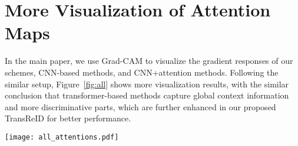 \documentclass[10pt,twocolumn,letterpaper]{article}
\begin{document}
\section{More Visualization of Attention Maps}
In the main paper, we use Grad-CAM to visualize the gradient responses of our schemes, CNN-based methods, and CNN+attention methods. Following the similar setup, Figure~\ref{fig:all} shows more visualization results, with the similar conclusion that transformer-based methods capture global context information and more discriminative parts, which are further enhanced in our proposed TransReID for better performance.

\begin{figure*}[t]
    \centering
    \texttt{[image: all\_attentions.pdf]}
	\vspace{-1.5em}
	\caption{Grad-CAM~\cite{grad_cam} visualization of attention maps. (a) Original images, (b) CNN-based methods, (c) CNN+Attention methods, (d) Transformer-based baseline, (e) TransReID w/o rearrange, (f) TransReID. Faces in the images are masked for anonymization.} 
	\vspace{-1.em}
	\label{fig:all}
\end{figure*}


 
\end{document}
